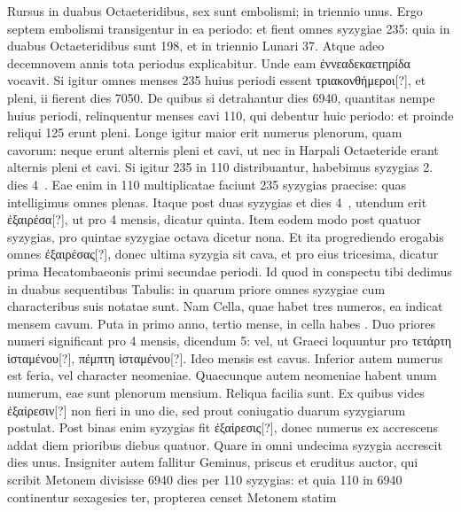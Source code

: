 Rursus in
duabus Octaeteridibus, sex sunt embolismi; in triennio unus.
Ergo septem embolismi transigentur in ea periodo: et fient omnes
syzygiae 235: quia in duabus Octaeteridibus sunt 198, et in triennio
Lunari 37.
Atque adeo decemnovem annis tota periodus explicabitur.
Unde eam \textgreek{ἐννεαδεκαετηρίδα} vocavit.
Si igitur omnes
menses 235 huius periodi essent \textgreek{τριακονθήμεροι[?]},
 et pleni, ii fierent
dies 7050.
De quibus si detrahantur dies 6940, quantitas nempe
huius periodi, relinquentur menses cavi 110, qui debentur
huic periodo: et proinde reliqui 125 erunt pleni.
Longe igitur
maior erit numerus plenorum, quam cavorum: neque erunt
alternis pleni et cavi, ut nec in Harpali Octaeteride erant alternis
pleni et cavi.
Si igitur 235 in 110 distribuantur, habebimus syzygias
2. dies 4~.
Eae enim in 110 multiplicatae faciunt 235 syzygias
praecise: quas intelligimus omnes plenas.
Itaque post duas
syzygias et dies 4~, utendum erit \textgreek{ἐξαιρέσα[?]},
 ut pro 4 mensis, dicatur
quinta.
Item eodem modo post quatuor syzygias, pro quintae
syzygiae octava dicetur nona.
Et ita progrediendo erogabis omnes
\textgreek{ἐξαιρέσας[?]}, donec ultima syzygia sit cava, et pro eius tricesima,
dicatur prima Hecatombaeonis primi secundae periodi.
Id
quod in conspectu tibi dedimus in duabus sequentibus Tabulis: in
quarum priore omnes syzygiae cum characteribus suis notatae sunt.
Nam Cella, quae habet tres numeros, ea indicat mensem cavum.
Puta in primo anno, tertio mense, in cella habes .
Duo
priores numeri significant pro 4 mensis, dicendum 5: vel, ut Graeci
loquuntur pro \textgreek{τετάρτη ἱσταμένου[?]}, \textgreek{πέμπτη ἱσταμένου[?]}.
Ideo mensis
est cavus.
Inferior autem numerus est feria, vel character neomeniae.
Quaecunque autem neomeniae habent unum numerum, eae
sunt plenorum mensium.
Reliqua facilia sunt.
Ex quibus vides
\textgreek{ἐξαίρεσιν[?]} non fieri in uno die,
 sed prout coniugatio duarum syzygiarum
postulat.
Post binas enim syzygias fit \textgreek{ἐξαίρεσις[?]}, donec numerus
ex  accrescens addat diem prioribus diebus quatuor.
Quare
in omni undecima syzygia accrescit dies unus.
Insigniter autem
fallitur Geminus, priscus et eruditus auctor, qui scribit Metonem
divisisse 6940 dies per 110 syzygias: et quia 110 in 6940
continentur sexagesies ter, propterea censet Metonem statim
